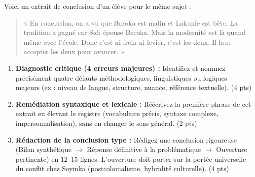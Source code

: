 \documentclass[11pt]{article}
\begin{document}
\begin{exercice}
Voici un extrait de conclusion d'un élève pour le même sujet : 
\begin{quote}
« En conclusion, on a vu que Baroka est malin et Lakunle est bête. La tradition a gagné car Sidi épouse Baroka. Mais la modernité est là quand même avec l'école. Donc c'est ni frein ni levier, c'est les deux. Il faut accepter les deux pour avancer. »
\end{quote}

\begin{enumerate}
    \item \textbf{Diagnostic critique (4 erreurs majeures) :} Identifiez et nommez précisément quatre défauts méthodologiques, linguistiques ou logiques majeurs (ex : niveau de langue, structure, nuance, référence textuelle). (4 pts)
    \item \textbf{Remédiation syntaxique et lexicale :} Réécrivez la première phrase de cet extrait en élevant le registre (vocabulaire précis, syntaxe complexe, impersonnalisation), sans en changer le sens général. (2 pts)
    \item \textbf{Rédaction de la conclusion type :} Rédigez une conclusion rigoureuse (Bilan synthétique $\rightarrow$ Réponse définitive à la problématique $\rightarrow$ Ouverture pertinente) en 12--15 lignes. L'ouverture doit porter sur la portée universelle du conflit chez Soyinka (postcolonialisme, hybridité culturelle). (4 pts)
\end{enumerate}
\end{exercice}
\end{document}
